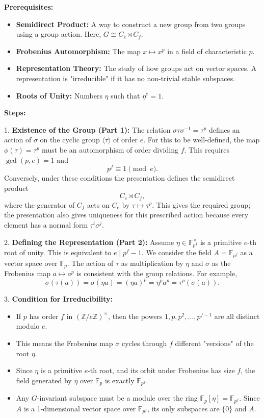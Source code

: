 \begin{solution}
\textbf{Prerequisites:}
\begin{itemize}
    \item \textbf{Semidirect Product:} A way to construct a new group from two groups using a group action. Here, $G \cong C_e \rtimes C_f$.
    \item \textbf{Frobenius Automorphism:} The map $x \mapsto x^p$ in a field of characteristic $p$.
    \item \textbf{Representation Theory:} The study of how groups act on vector spaces. A representation is "irreducible" if it has no non-trivial stable subspaces.
    \item \textbf{Roots of Unity:} Numbers $\eta$ such that $\eta^e = 1$.
\end{itemize}

\textbf{Steps:}

1. \textbf{Existence of the Group (Part 1):} The relation $\sigma\tau\sigma^{-1} = \tau^p$ defines an action of $\sigma$ on the cyclic group $\langle \tau \rangle$ of order $e$. For this to be well-defined, the map $\phi(\tau) = \tau^p$ must be an automorphism of order dividing $f$. This requires $\gcd(p,e)=1$ and
\[
p^f\equiv 1\pmod e.
\]
Conversely, under these conditions the presentation defines the semidirect product
\[
C_e\rtimes C_f,
\]
where the generator of $C_f$ acts on $C_e$ by $\tau\mapsto\tau^p$. This gives the required group; the presentation also gives uniqueness for this prescribed action because every element has a normal form $\tau^i\sigma^j$.

2. \textbf{Defining the Representation (Part 2):} Assume $\eta\in \mathbb{F}_{p^f}^{\times}$ is a primitive $e$-th root of unity. This is equivalent to $e\mid p^f-1$. We consider the field $A = \mathbb{F}_{p^f}$ as a vector space over $\mathbb{F}_p$. The action of $\tau$ as multiplication by $\eta$ and $\sigma$ as the Frobenius map $a \mapsto a^p$ is consistent with the group relations. For example,
\[
\sigma(\tau(a)) = \sigma(\eta a) = (\eta a)^p = \eta^p a^p = \tau^p(\sigma(a)).
\]

3. \textbf{Condition for Irreducibility:} 
    \begin{itemize}
        \item If $p$ has order $f$ in $(\mathbb{Z}/e\mathbb{Z})^\times$, then the powers $1, p, p^2, \dots, p^{f-1}$ are all distinct modulo $e$.
        \item This means the Frobenius map $\sigma$ cycles through $f$ different "versions" of the root $\eta$.
        \item Since $\eta$ is a primitive $e$-th root, and its orbit under Frobenius has size $f$, the field generated by $\eta$ over $\mathbb{F}_p$ is exactly $\mathbb{F}_{p^f}$.
        \item Any $G$-invariant subspace must be a module over the ring $\mathbb{F}_p[\eta] = \mathbb{F}_{p^f}$. Since $A$ is a 1-dimensional vector space over $\mathbb{F}_{p^f}$, its only subspaces are $\{0\}$ and $A$.
    \end{itemize}


\end{solution}

